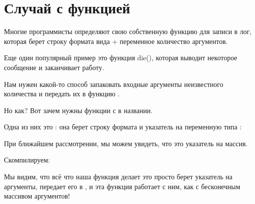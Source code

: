 \section{Случай с функцией }

Многие программисты определяют свою собственную функцию для записи в лог, которая берет строку формата 
вида \printf + переменное количество аргументов.

Еще один популярный пример это функция die(), которая выводит некоторое сообщение и заканчивает работу.

Нам нужен какой-то способ запаковать входные аргументы неизвестного количества и передать их в функцию \printf.

Но как?
Вот зачем нужны функции с  в названии.

Одна из них это : она берет строку формата и указатель на переменную типа :



При ближайшем рассмотрении, мы можем увидеть, что  это указатель на массив.

Скомпилируем:



Мы видим, что всё что наша функция делает это просто берет указатель на аргументы, 
передает его в ,
и эта функция работает с ним, как с бесконечным массивом аргументов!


